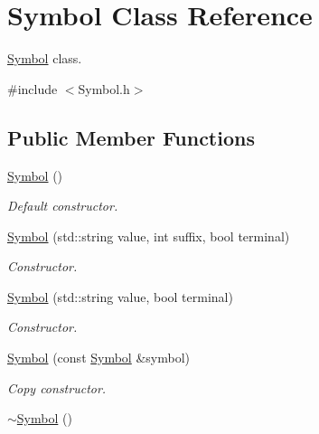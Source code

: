 \hypertarget{class_symbol}{\section{\-Symbol \-Class \-Reference}
\label{class_symbol}
}


\hyperlink{class_symbol}{\-Symbol} class.  




{\ttfamily \#include $<$\-Symbol.\-h$>$}

\subsection*{\-Public \-Member \-Functions}
\begin{DoxyCompactItemize}
\item 
\hypertarget{class_symbol_a9bb4fb952a2f62228b34fd5ff45ca108}{\hyperlink{class_symbol_a9bb4fb952a2f62228b34fd5ff45ca108}{\-Symbol} ()}\label{class_symbol_a9bb4fb952a2f62228b34fd5ff45ca108}

\begin{DoxyCompactList}\small\item\em \-Default constructor. \end{DoxyCompactList}\item 
\hyperlink{class_symbol_afae7aca3bcef4136af61fac19f4d3d43}{\-Symbol} (std\-::string value, int suffix, bool terminal)
\begin{DoxyCompactList}\small\item\em \-Constructor. \end{DoxyCompactList}\item 
\hyperlink{class_symbol_a190320f83f8a279ab527847b20558d71}{\-Symbol} (std\-::string value, bool terminal)
\begin{DoxyCompactList}\small\item\em \-Constructor. \end{DoxyCompactList}\item 
\hyperlink{class_symbol_ac9abc4eeb75285e84b51c1b53290e0f6}{\-Symbol} (const \hyperlink{class_symbol}{\-Symbol} \&symbol)
\begin{DoxyCompactList}\small\item\em \-Copy constructor. \end{DoxyCompactList}\item 
\hypertarget{class_symbol_a505360ad4bd2e0bd1e3954eca1b05723}{\hyperlink{class_symbol_a505360ad4bd2e0bd1e3954eca1b05723}{$\sim$\-Symbol} ()}\label{class_symbol_a505360ad4bd2e0bd1e3954eca1b05723}


\end{DoxyCompactItemize}
